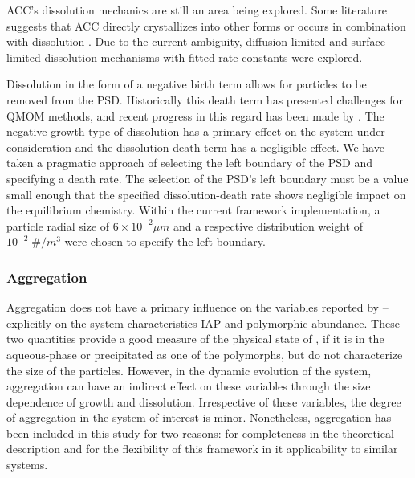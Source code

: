 \documentclass[preprint,3p,a4paper,times,12pt,authoryear]{elsarticle}
\begin{document}

ACC's dissolution mechanics are still an area being explored.  Some literature suggests that ACC directly crystallizes into other forms or occurs in combination with dissolution \citep{Rodriguez-Blanco2011,Bots2012}.  Due to the current ambiguity, diffusion limited and surface limited dissolution mechanisms with fitted rate constants were explored.

Dissolution in the form of a negative birth term allows for particles to be removed from the PSD.  Historically this death term has presented challenges for QMOM methods, and recent progress in this regard has been made by \citet{Yuan2012}. The negative growth type of dissolution has a primary effect on the system under consideration and the dissolution-death term has a negligible effect.  We have taken a pragmatic approach of selecting the left boundary of the PSD and specifying a death rate.  The selection of the PSD's left boundary must be a value small enough that the specified dissolution-death rate shows negligible impact on the equilibrium chemistry.  Within the current framework implementation, a particle radial size of $6 \times 10^{-2} \mu m$ and a respective distribution weight of $10^{-2} \; \# / m^{3}$ were chosen to specify the left boundary.

\subsubsection{Aggregation}
\label{Agg_Section}

Aggregation does not have a primary influence on the variables reported by \citet{Ogino1987} -- explicitly on the system characteristics IAP and polymorphic abundance. These two quantities provide a good measure of the physical state of , if it is in the aqueous-phase or precipitated as one of the polymorphs, but do not characterize the size of the particles. However, in the dynamic evolution of the system, aggregation can have an indirect effect on these variables through the size dependence of growth and dissolution. Irrespective of these variables, the degree of aggregation in the system of interest is minor. Nonetheless, aggregation has been included in this study for two reasons: for completeness in the theoretical description and for the flexibility of this framework in it applicability to similar systems.
\end{document}
